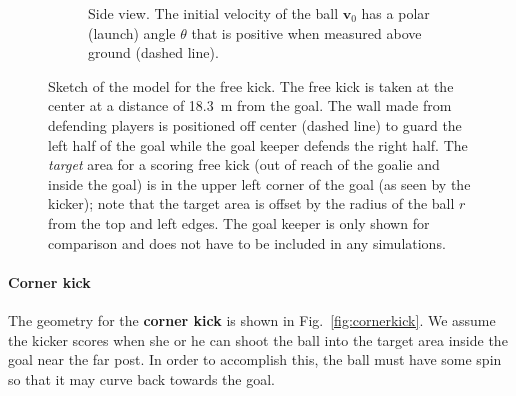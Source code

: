 \documentclass[letterpaper]{scrartcl}
\renewcommand{\vec}[1]{\ensuremath{\mathbf{#1}}}
\begin{document}
\begin{figure}
\begin{subfigure}[b]{0.4\linewidth}
    \caption{Side view. The initial velocity of the ball $\vec{v}_{0}$
      has a polar (launch) angle $\theta$ that is positive when
      measured above ground (dashed line).}
    \label{fig:freekickside}
  \end{subfigure}
  \caption{Sketch of the model for the free kick. The free kick is
    taken at the center at a distance of \SI{18.3}{m} from the
    goal. The wall made from defending players is positioned off
    center (dashed line) to guard the left half of the goal while the
    goal keeper defends the right half. The \emph{target} area for a
    scoring free kick (out of reach of the goalie and inside the goal)
    is in the upper left corner of the goal (as seen by the kicker);
    note that the target area is offset by the radius of the ball $r$
    from the top and left edges. The goal keeper is only shown for
    comparison and does not have to be included in any simulations.}
  \label{fig:freekick}
\end{figure}

\paragraph{Corner kick}

The geometry for the \textbf{corner kick} is shown in
Fig.~\ref{fig:cornerkick}. We assume the kicker scores when she or he
can shoot the ball into the target area inside the goal near the far
post. In order to accomplish this, the ball must have some spin so
that it may curve back towards the goal.
\end{document}

